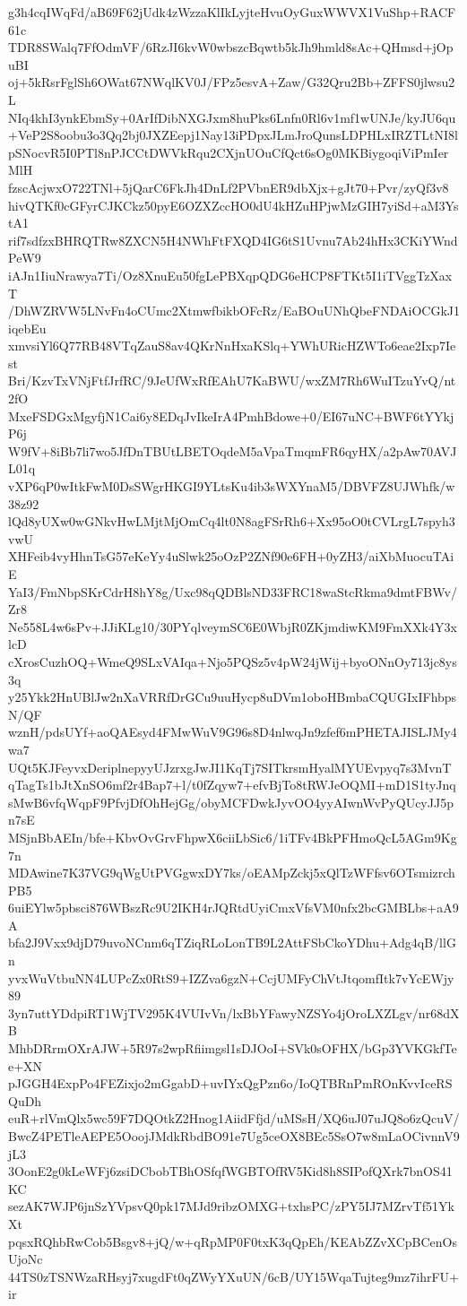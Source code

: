 g3h4cqIWqFd/aB69F62jUdk4zWzzaKlIkLyjteHvuOyGuxWWVX1VuShp+RACF61c
TDR8SWalq7FfOdmVF/6RzJI6kvW0wbszcBqwtb5kJh9hmld8sAc+QHmsd+jOpuBI
oj+5kRsrFglSh6OWat67NWqlKV0J/FPz5esvA+Zaw/G32Qru2Bb+ZFFS0jlwsu2L
NIq4khI3ynkEbmSy+0ArIfDibNXGJxm8huPks6Lnfn0Rl6v1mf1wUNJe/kyJU6qu
+VeP2S8oobu3o3Qq2bj0JXZEepj1Nay13iPDpxJLmJroQunsLDPHLxIRZTLtNI8l
pSNocvR5I0PTl8nPJCCtDWVkRqu2CXjnUOuCfQct6sOg0MKBiygoqiViPmIerMlH
fzscAcjwxO722TNl+5jQarC6FkJh4DnLf2PVbnER9dbXjx+gJt70+Pvr/zyQf3v8
hivQTKf0cGFyrCJKCkz50pyE6OZXZccHO0dU4kHZuHPjwMzGIH7yiSd+aM3YstA1
rif7sdfzxBHRQTRw8ZXCN5H4NWhFtFXQD4IG6tS1Uvnu7Ab24hHx3CKiYWndPeW9
iAJn1IiuNrawya7Ti/Oz8XnuEu50fgLePBXqpQDG6eHCP8FTKt5I1iTVggTzXaxT
/DhWZRVW5LNvFn4oCUmc2XtmwfbikbOFcRz/EaBOuUNhQbeFNDAiOCGkJ1iqebEu
xmvsiYl6Q77RB48VTqZauS8av4QKrNnHxaKSlq+YWhURicHZWTo6eae2Ixp7Iest
Bri/KzvTxVNjFtfJrfRC/9JeUfWxRfEAhU7KaBWU/wxZM7Rh6WuITzuYvQ/nt2fO
MxeFSDGxMgyfjN1Cai6y8EDqJvIkeIrA4PmhBdowe+0/EI67uNC+BWF6tYYkjP6j
W9fV+8iBb7li7wo5JfDnTBUtLBETOqdeM5aVpaTmqmFR6qyHX/a2pAw70AVJL01q
vXP6qP0wItkFwM0DsSWgrHKGI9YLtsKu4ib3sWXYnaM5/DBVFZ8UJWhfk/w38z92
lQd8yUXw0wGNkvHwLMjtMjOmCq4lt0N8agFSrRh6+Xx95oO0tCVLrgL7spyh3vwU
XHFeib4vyHhnTsG57eKeYy4uSlwk25oOzP2ZNf90e6FH+0yZH3/aiXbMuocuTAiE
YaI3/FmNbpSKrCdrH8hY8g/Uxc98qQDBlsND33FRC18waStcRkma9dmtFBWv/Zr8
Ne558L4w6sPv+JJiKLg10/30PYqlveymSC6E0WbjR0ZKjmdiwKM9FmXXk4Y3xlcD
cXrosCuzhOQ+WmeQ9SLxVAIqa+Njo5PQSz5v4pW24jWij+byoONnOy713jc8ys3q
y25Ykk2HnUBlJw2nXaVRRfDrGCu9uuHycp8uDVm1oboHBmbaCQUGIxIFhbpsN/QF
wznH/pdsUYf+aoQAEsyd4FMwWuV9G96s8D4nlwqJn9zfef6mPHETAJISLJMy4wa7
UQt5KJFeyvxDeriplnepyyUJzrxgJwJI1KqTj7SITkrsmHyalMYUEvpyq7s3MvnT
qTagTs1bJtXnSO6mf2r4Bap7+l/t0fZqyw7+efvBjTo8tRWJeOQMI+mD1S1tyJnq
sMwB6vfqWqpF9PfvjDfOhHejGg/obyMCFDwkJyvOO4yyAIwnWvPyQUcyJJ5pn7sE
MSjnBbAEIn/bfe+KbvOvGrvFhpwX6ciiLbSic6/1iTFv4BkPFHmoQcL5AGm9Kg7n
MDAwine7K37VG9qWgUtPVGgwxDY7ks/oEAMpZckj5xQlTzWFfsv6OTsmizrchPB5
6uiEYlw5pbsci876WBszRc9U2IKH4rJQRtdUyiCmxVfsVM0nfx2bcGMBLbs+aA9A
bfa2J9Vxx9djD79uvoNCnm6qTZiqRLoLonTB9L2AttFSbCkoYDhu+Adg4qB/llGn
yvxWuVtbuNN4LUPcZx0RtS9+IZZva6gzN+CcjUMFyChVtJtqomfItk7vYcEWjy89
3yn7uttYDdpiRT1WjTV295K4VUIvVn/lxBbYFawyNZSYo4jOroLXZLgv/nr68dXB
MhbDRrmOXrAJW+5R97s2wpRfiimgsl1sDJOoI+SVk0sOFHX/bGp3YVKGkfTee+XN
pJGGH4ExpPo4FEZixjo2mGgabD+uvIYxQgPzn6o/IoQTBRnPmROnKvvIceRSQuDh
euR+rlVmQlx5wc59F7DQOtkZ2Hnog1AiidFfjd/uMSsH/XQ6uJ07uJQ8o6zQcuV/
BwcZ4PETleAEPE5OoojJMdkRbdBO91e7Ug5ceOX8BEc5SsO7w8mLaOCivnnV9jL3
3OonE2g0kLeWFj6zsiDCbobTBhOSfqfWGBTOfRV5Kid8h8SIPofQXrk7bnOS41KC
sezAK7WJP6jnSzYVpsvQ0pk17MJd9ribzOMXG+txhsPC/zPY5IJ7MZrvTf51YkXt
pqsxRQhbRwCob5Bsgv8+jQ/w+qRpMP0F0txK3qQpEh/KEAbZZvXCpBCenOsUjoNc
44TS0zTSNWzaRHsyj7xugdFt0qZWyYXuUN/6cB/UY15WqaTujteg9mz7ihrFU+ir
